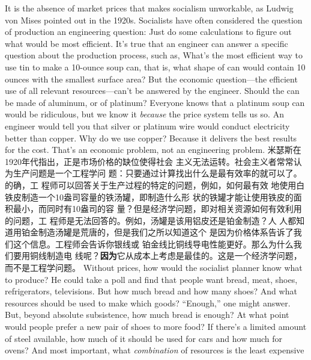 \begin{paracol}{2}
It is the absence of market prices that makes socialism unworkable, as Ludwig von Mises pointed out in the 1920s. Socialists
have often considered the question of production an engineering question: Just do some calculations to figure out what
would be most efficient. It's true that an engineer can answer a
specific question about the production process, such as, What's
the most efficient way to use tin to make a 10-ounce soup can,
that is, what shape of can would contain 10 ounces with the
smallest surface area? But the economic question---the efficient
use of all relevant resources---can't be answered by the engineer. Should the can be made of aluminum, or of platinum?
Everyone knows that a platinum soup can would be ridiculous,
but we know it \textit{because} the price system tells us so. An engineer
would tell you that silver or platinum wire would conduct electricity better than copper. Why do we use copper? Because it
delivers the best results for the cost. That's an economic problem, not an engineering problem.
\switchcolumn
米瑟斯在1920年代指出，正是市场价格的缺位使得社会
主义无法运转。社会主义者常常认为生产问题是一个工程学问
题：只要通过计算找出什么是最有效率的就可以了。的确，工
程师可以回答关于生产过程的特定的问题，例如，如何最有效
地使用白铁皮制造一个10盎司容量的铁汤罐，即制造什么形
状的铁罐才能让使用铁皮的面积最小，而同时有10盎司的容
量？但是经济学问题，即对相关资源如何有效利用的问题，工
程师是无法回答的。例如，汤罐是该用铝皮还是铂金制造？人
人都知道用铂金制造汤罐是荒唐的，但是我们之所以知道这个
是因为价格体系告诉了我们这个信息。工程师会告诉你银线或
铂金线比铜线导电性能更好。那么为什么我们要用铜线制造电
线呢？\textbf{因为}它从成本上考虑是最佳的。这是一个经济学问题，
而不是工程学问题。
\switchcolumn*
Without prices, how would the socialist planner know what
to produce? He could take a poll and find that people want
bread, meat, shoes, refrigerators, televisions. But how much
bread and how many shoes? And what resources should be used to make which goods? ``Enough,'' one might answer. But, beyond absolute subsistence, how much bread is enough? At what
point would people prefer a new pair of shoes to more food? If
there's a limited amount of steel available, how much of it
should be used for cars and how much for ovens? And most important, what \textit{combination} of resources is the least expensive

\end{paracol}
